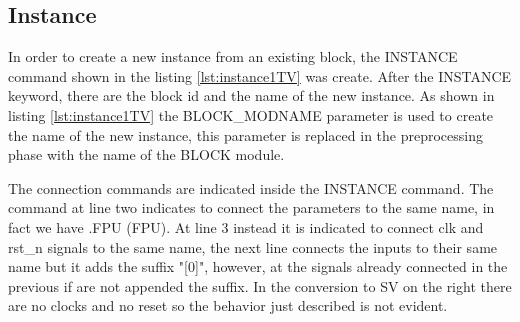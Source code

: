 {{    	\subsection{Instance}{

    
            In order to create a new instance from an existing block, the INSTANCE command shown in the listing \ref{lst:instance1TV} was create. After the INSTANCE keyword, there are the block id and the name of the new instance. As shown in listing \ref{lst:instance1TV} the BLOCK\_MODNAME parameter is used to create the name of the new instance, this parameter is replaced in the preprocessing phase with the name of the BLOCK module.
            
            The connection commands are indicated inside the INSTANCE command. The command at line two indicates to connect the parameters to the same name, in fact we have .FPU (FPU). At line 3 instead it is indicated to connect clk and rst\_n signals to the same name, the next line connects the inputs to their same name but it adds the suffix "[0]", however, at the signals already connected in the previous if are not appended the suffix. In the conversion to SV on the right there are no clocks and no reset so the behavior just described is not evident.
            
}}}
